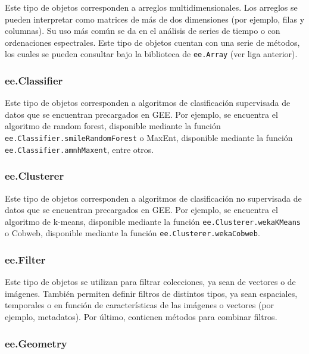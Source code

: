 \documentclass[
  12pt,
  letterpaper,
  twoside]{book}
\begin{document}
Este tipo de objetos corresponden a arreglos multidimensionales. Los arreglos se pueden interpretar como matrices de más de dos dimensiones (por ejemplo, filas y columnas). Su uso más común se da en el análisis de series de tiempo o con ordenaciones espectrales. Este tipo de objetos cuentan con una serie de métodos, los cuales se pueden consultar bajo la biblioteca de \texttt{ee.Array} (ver liga anterior).

\hypertarget{ee.classifier}{%
\subsubsection*{ee.Classifier}\label{ee.classifier}}

Este tipo de objetos corresponden a algoritmos de clasificación supervisada de datos que se encuentran precargados en GEE. Por ejemplo, se encuentra el algoritmo de random forest, disponible mediante la función \texttt{ee.Classifier.smileRandomForest} o MaxEnt, disponible mediante la función \texttt{ee.Classifier.amnhMaxent}, entre otros.

\hypertarget{ee.clusterer}{%
\subsubsection*{ee.Clusterer}\label{ee.clusterer}}

Este tipo de objetos corresponden a algoritmos de clasificación no supervisada de datos que se encuentran precargados en GEE. Por ejemplo, se encuentra el algoritmo de k-means, disponible mediante la función \texttt{ee.Clusterer.wekaKMeans} o Cobweb, disponible mediante la función \texttt{ee.Clusterer.wekaCobweb}.

\hypertarget{ee.filter}{%
\subsubsection*{ee.Filter}\label{ee.filter}}

Este tipo de objetos se utilizan para filtrar colecciones, ya sean de vectores o de imágenes. También permiten definir filtros de distintos tipos, ya sean espaciales, temporales o en función de características de las imágenes o vectores (por ejemplo, metadatos). Por último, contienen métodos para combinar filtros.

\hypertarget{ee.geometry}{%
\subsubsection*{ee.Geometry}\label{ee.geometry}}
\end{document}
